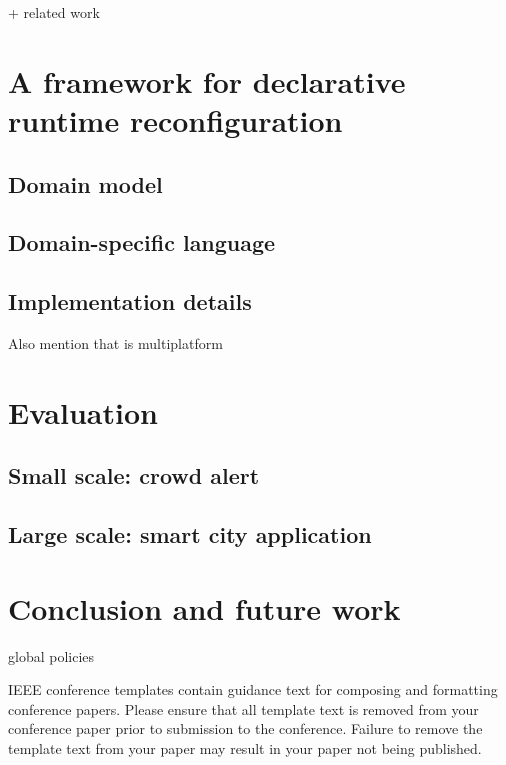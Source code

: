 \documentclass[conference]{IEEEtran}
\begin{document}
+ related work

\section{A framework for declarative runtime reconfiguration}\label{sec:contribution}

\subsection{Domain model}

\subsection{Domain-specific language}

\subsection{Implementation details}

Also mention that is multiplatform

\section{Evaluation}\label{sec:evaluation}

\subsection{Small scale: crowd alert}

\subsection{Large scale: smart city application}
\cite{PianiniJOS2013}

\section{Conclusion and future work}\label{sec:conclusion}

global policies




\vspace{12pt}
\color{red}
IEEE conference templates contain guidance text for composing and formatting conference papers. Please ensure that all template text is removed from your conference paper prior to submission to the conference. Failure to remove the template text from your paper may result in your paper not being published.
\end{document}
